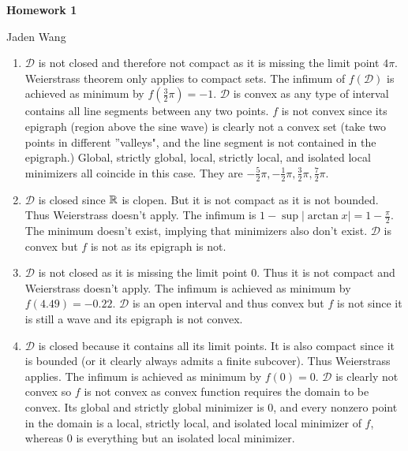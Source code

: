 \documentclass[12pt]{article}
\begin{document}
\centerline {\textsf{\textbf{\LARGE{Homework 1}}}}
\centerline {Jaden Wang}
\vspace{.15in}
\begin{problem}[1]
\begin{enumerate}[label=(\alph*)]
Given that the responses are repetitive, I give more details in part (a) and give briefer explanations elsewhere.
	\item $ \mathcal{ D}$ is not closed and therefore not compact as it is missing the limit point $ 4 \pi$. Weierstrass theorem only applies to compact sets. The infimum of $ f( \mathcal{ D})$ is achieved as minimum by $ f\left( \frac{3}{2} \pi \right) = -1$. $ \mathcal{ D}$ is convex as any type of interval contains all line segments between any two points. $ f$ is not convex since its epigraph (region above the sine wave) is clearly not a convex set (take two points in different ''valleys", and the line segment is not contained in the epigraph.) Global, strictly global, local, strictly local, and isolated local minimizers all coincide in this case. They are $-\frac{5}{2}\pi, -\frac{1}{2} \pi, \frac{3}{2}\pi, \frac{7}{2} \pi$.
	\item $ \mathcal{ D}$ is closed since $ \mathbb{R}$ is clopen. But it is not compact as it is not bounded. Thus Weierstrass doesn't apply. The infimum is $1- \sup| \arctan x| = 1 - \frac{\pi}{ 2}$. The minimum doesn't exist, implying that minimizers also don't exist. $ \mathcal{ D}$ is convex but $ f$ is not as its epigraph is not.
	\item  $ \mathcal{ D}$ is not closed as it is missing the limit point 0. Thus it is not compact and Weierstrass doesn't apply. The infimum is achieved as minimum by $ f(4.49) = -0.22$.  $ \mathcal{ D}$ is an open interval and thus convex but $ f$ is not since it is still a wave and its epigraph is not convex.
	\item  $ \mathcal{ D}$ is closed because it contains all its limit points. It is also compact since it is bounded (or it clearly always admits a finite subcover). Thus Weierstrass applies. The infimum is achieved as minimum by $ f(0) = 0$.  $ \mathcal{ D}$ is clearly not convex so $ f$ is not convex as convex function requires the domain to be convex. Its global and strictly global minimizer is 0, and every nonzero point in the domain is a local, strictly local, and isolated local minimizer of  $ f$, whereas 0 is everything but an isolated local minimizer.
\end{enumerate}
\end{problem}
\end{document}
